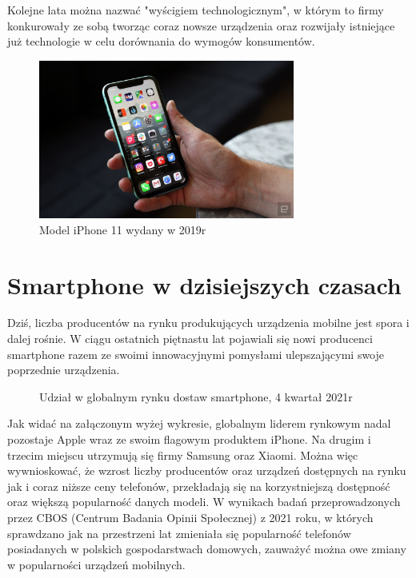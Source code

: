 \documentclass[a4paper,12pt,oneside]{book}
\begin{document}
	Kolejne lata można nazwać "wyścigiem technologicznym", w którym to firmy konkurowały ze sobą tworząc coraz nowsze urządzenia oraz rozwijały istniejące już technologie w celu dorównania do wymogów konsumentów.
	
	\begin{figure}[h]
		\centering
		\includegraphics[width=0.75\textwidth]{grafika/iphone11}
		\caption{Model iPhone 11 wydany w 2019r}
	\end{figure}
	
	\newpage
	\section{Smartphone w dzisiejszych czasach}
	Dziś, liczba producentów na rynku produkujących urządzenia mobilne jest spora i dalej rośnie. W ciągu ostatnich piętnastu lat pojawiali się nowi producenci smartphone razem ze swoimi innowacyjnymi pomysłami ulepszającymi swoje poprzednie urządzenia. 
	
	\begin{figure}[h]
		\centering
		\caption{Udział w globalnym rynku dostaw smartphone, 4 kwartał 2021r}
	\end{figure}
	
	Jak widać na załączonym wyżej wykresie, globalnym liderem rynkowym nadal pozostaje Apple wraz ze swoim flagowym produktem iPhone. Na drugim i trzecim miejscu utrzymują się firmy Samsung oraz Xiaomi. Można więc wywnioskować, że wzrost liczby producentów oraz urządzeń dostępnych na rynku jak i coraz niższe ceny telefonów, przekładają się na korzystniejszą dostępność oraz większą popularność danych modeli. W wynikach badań przeprowadzonych przez CBOS (Centrum Badania Opinii Społecznej) z 2021 roku, w których sprawdzano jak na przestrzeni lat zmieniała się popularność telefonów posiadanych w polskich gospodarstwach domowych, zauważyć można owe zmiany w popularności urządzeń mobilnych.
	
\end{document}
